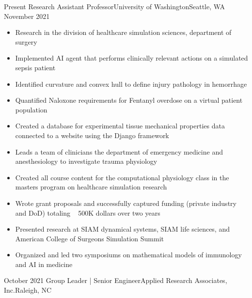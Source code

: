 %
%
%

\begin{experiences}
  \experience
    {Present}   {Research Assistant Professor}{University of Washington}{Seattle, WA}
    {November 2021} {
                      \begin{itemize}
                        \item Research in the division of healthcare simulation sciences, department of surgery
                        \item Implemented AI agent that performs clinically relevant actions on a simulated sepsis patient
                        \item Identified curvature and convex hull to define injury pathology in hemorrhage
                        \item Quantified Naloxone requirements for Fentanyl overdose on a virtual patient population 
                        \item Created a database for experimental tissue mechanical properties data connected to a website using the Django framework
                        \item Leads a team of clinicians the department of emergency medicine and anesthesiology to investigate trauma physiology
                        \item Created all course content for the computational physiology class in the masters program on healthcare simulation research
                        \item Wrote grant proposals and successfully captured funding (private industry and DoD) totaling ~ 500K dollars over two years
                        \item Presented research at SIAM dynamical systems, SIAM life sciences, and American College of Surgeons Simulation Summit 
                        \item Organized and led two symposiums on mathematical models of immunology and AI in medicine  
                      \end{itemize}
                    }
                    {}
  \emptySeparator
  \experience
    {October 2021} {Group Leader | Senior Engineer}{Applied Research Associates, Inc.}{Raleigh, NC}

\end{experiences}
